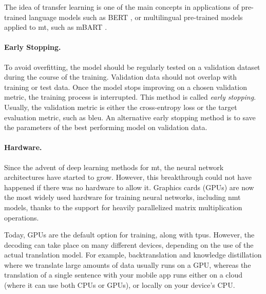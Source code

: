 The idea of transfer learning is one of the main concepts in applications of
pre-trained language models such as BERT \citep{devlin-etal-2019-bert}, or
multilingual pre-trained models applied to \ac{mt}, such as mBART
\citep{liu-etal-2020-multilingual}.

\paragraph{Early Stopping.} To avoid overfitting, the model should be regularly
tested on a validation dataset during the course of the training. Validation
data should not overlap with training or test data. Once the model stops
improving on a chosen validation metric, the training process is
interrupted. This method is called \emph{early stopping}. Usually, the
validation metric is either the cross-entropy loss or the target evaluation
metric, such as \acs{bleu}. An alternative early stopping method is to save the
parameters of the best performing model on validation data.

\paragraph{Hardware.} Since the advent of deep learning methods for \ac{mt},
the neural network architectures have started to grow. However, this
breakthrough could not have happened if there was no hardware to allow
it. Graphics cards (GPUs) are now the most widely used hardware for training
neural networks, including \ac{nmt} models, thanks to the support for heavily
parallelized matrix multiplication operations.

Today, GPUs are the default option for training, along with \acp{tpu}. However,
the decoding can take place on many different devices, depending on the use of
the actual translation model. For example, backtranslation and knowledge
distillation where we translate large amounts of data usually runs on a GPU,
whereas the translation of a single sentence with your mobile app runs either
on a cloud (where it can use both CPUs or GPUs), or locally on your device's
CPU.

